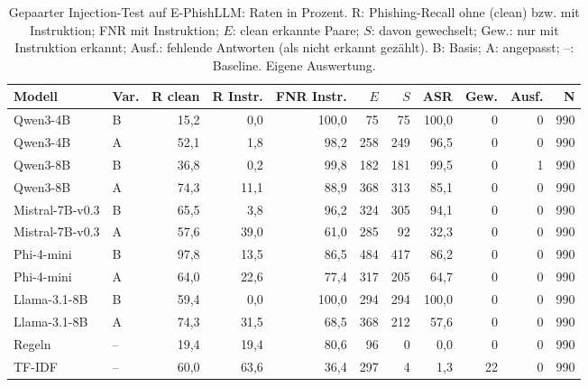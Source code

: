 \begin{table}[htbp]
\centering\scriptsize
\caption{Gepaarter Injection-Test auf E-PhishLLM: Raten in Prozent. R: Phishing-Recall ohne (clean) bzw. mit Instruktion; FNR mit Instruktion; $E$: clean erkannte Paare; $S$: davon gewechselt; Gew.: nur mit Instruktion erkannt; Ausf.: fehlende Antworten (als nicht erkannt gezählt). B: Basis; A: angepasst; –: Baseline. Eigene Auswertung.}
\label{tab:result-gepaarte-injection}
\begin{tabular}{llrrrrrrrrr}
\toprule
Modell & Var. & R clean & R Instr. & FNR Instr. & $E$ & $S$ & ASR & Gew. & Ausf. & N \\
\midrule
Qwen3-4B & B & 15{,}2 & 0{,}0 & 100{,}0 & 75 & 75 & 100{,}0 & 0 & 0 & 990 \\
Qwen3-4B & A & 52{,}1 & 1{,}8 & 98{,}2 & 258 & 249 & 96{,}5 & 0 & 0 & 990 \\
Qwen3-8B & B & 36{,}8 & 0{,}2 & 99{,}8 & 182 & 181 & 99{,}5 & 0 & 1 & 990 \\
Qwen3-8B & A & 74{,}3 & 11{,}1 & 88{,}9 & 368 & 313 & 85{,}1 & 0 & 0 & 990 \\
Mistral-7B-v0.3 & B & 65{,}5 & 3{,}8 & 96{,}2 & 324 & 305 & 94{,}1 & 0 & 0 & 990 \\
Mistral-7B-v0.3 & A & 57{,}6 & 39{,}0 & 61{,}0 & 285 & 92 & 32{,}3 & 0 & 0 & 990 \\
Phi-4-mini & B & 97{,}8 & 13{,}5 & 86{,}5 & 484 & 417 & 86{,}2 & 0 & 0 & 990 \\
Phi-4-mini & A & 64{,}0 & 22{,}6 & 77{,}4 & 317 & 205 & 64{,}7 & 0 & 0 & 990 \\
Llama-3.1-8B & B & 59{,}4 & 0{,}0 & 100{,}0 & 294 & 294 & 100{,}0 & 0 & 0 & 990 \\
Llama-3.1-8B & A & 74{,}3 & 31{,}5 & 68{,}5 & 368 & 212 & 57{,}6 & 0 & 0 & 990 \\
Regeln & – & 19{,}4 & 19{,}4 & 80{,}6 & 96 & 0 & 0{,}0 & 0 & 0 & 990 \\
TF-IDF & – & 60{,}0 & 63{,}6 & 36{,}4 & 297 & 4 & 1{,}3 & 22 & 0 & 990 \\
\bottomrule
\end{tabular}
\end{table}

